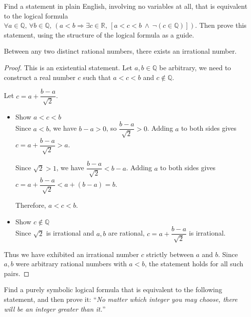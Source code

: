 
\begin{chapex}
Find a statement in plain English, involving no variables at all, that is equivalent to the logical formula $\forall a \in \mathbb{Q},\, \forall b \in \mathbb{Q},\, (a < b \Rightarrow \exists c \in \mathbb{R},\, [a < c < b ~\wedge~ \neg (c \in \mathbb{Q})])$. Then prove this statement, using the structure of the logical formula as a guide.
\end{chapex}

\begin{mysolution}
    \fixlistskip
    \begin{center}
        Between any two distinct rational numbers, there exists an irrational number.
    \end{center}
    \begin{proof}
        This is an existential statement. Let $a, b \in \mathbb{Q}$ be arbitrary, we need to construct a real number $c$ such that $a < c < b$ and $c \not\in \mathbb{Q}$. 

        Let $c=a+\dfrac{b-a}{\sqrt{2}}$.
        \begin{itemize}
            \item Show $a < c < b$ \\
            Since $a < b$, we have $b-a > 0$, so $\dfrac{b-a}{\sqrt{2}} > 0$. Adding $a$ to both sides gives $c = a + \dfrac{b-a}{\sqrt{2}} > a$. 
            
            Since $\sqrt{2} > 1$, we have $\dfrac{b-a}{\sqrt{2}} < b-a$. Adding $a$ to both sides gives $c = a + \dfrac{b-a}{\sqrt{2}} < a + (b-a) = b$.
            
            Therefore, $a < c < b$.
            \item Show $c \not\in \mathbb{Q}$ \\
            Since $\sqrt{2}$ is irrational and $a, b$ are rational, $c = a + \dfrac{b-a}{\sqrt{2}}$ is irrational.
        \end{itemize}

        Thus we have exhibited an irrational number $c$ strictly between $a$ and $b$. Since $a,b$ were arbitrary rational numbers with $a<b$, the statement holds for all such pairs.
    \end{proof}
\end{mysolution}

\begin{chapex}
Find a purely symbolic logical formula that is equivalent to the following statement, and then prove it: ``\textit{No matter which integer you may choose, there will be an integer greater than it.}''
\end{chapex}

